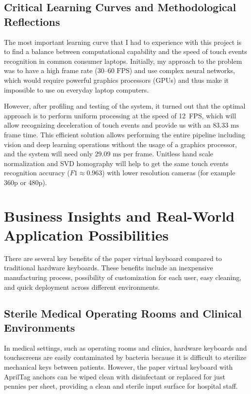 \subsection{Critical Learning Curves and Methodological Reflections}
\label{subsec:concl_learning_curves}
The most important learning curve that I had to experience with this project is to find a balance between computational capability and the speed of touch events recognition in common consumer laptops. Initially, my approach to the problem was to have a high frame rate ($30\text{--}60\text{ FPS}$) and use complex neural networks, which would require powerful graphics processors (GPUs) and thus make it impossible to use on everyday laptop computers.

However, after profiling and testing of the system, it turned out that the optimal approach is to perform uniform processing at the speed of 12~FPS, which will allow recognizing deceleration of touch events and provide us with an $83.33\text{ ms}$ frame time. This efficient solution allows performing the entire pipeline including vision and deep learning operations without the usage of a graphics processor, and the system will need only $29.09\text{ ms}$ per frame. Unitless hand scale normalization and SVD homography will help to get the same touch events recognition accuracy ($F1 \approx 0.963$) with lower resolution cameras (for example 360p or 480p).

\section{Business Insights and Real-World Application Possibilities}
\label{sec:concl_business}
There are several key benefits of the paper virtual keyboard compared to traditional hardware keyboards. These benefits include an inexpensive manufacturing process, possibility of customization for each user, easy cleaning, and quick deployment across different environments.

\subsection{Sterile Medical Operating Rooms and Clinical Environments}
In medical settings, such as operating rooms and clinics, hardware keyboards and touchscreens are easily contaminated by bacteria because it is difficult to sterilize mechanical keys between patients. However, the paper virtual keyboard with AprilTag anchors can be wiped clean with disinfectant or replaced for just pennies per sheet, providing a clean and sterile input surface for hospital staff.

